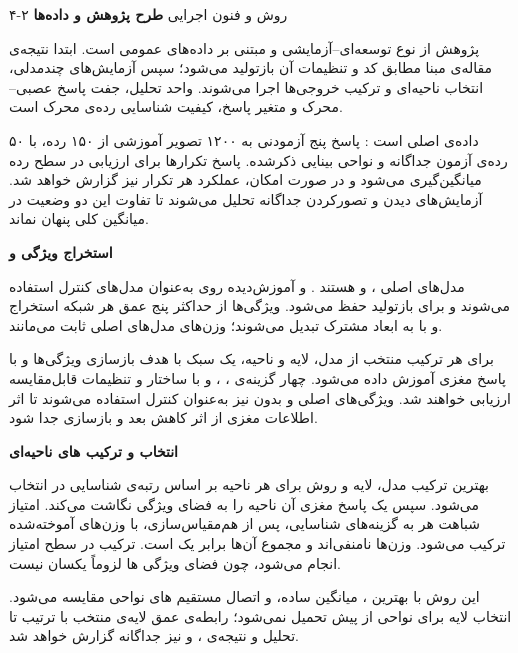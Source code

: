\documentclass{ut-proposal}
\newcommand{\ProposalSubheading}[1]{\textcolor{UTBlue}{\textbf{#1}}}
\begin{document}
	\begin{UTProposalSection}{۴-۲ روش و فنون اجرایی}
		\ProposalSubheading{طرح پژوهش و داده‌ها}

		پژوهش از نوع توسعه‌ای–آزمایشی و مبتنی بر داده‌های عمومی است. ابتدا نتیجه‌ی مقاله‌ی مبنا مطابق کد و تنظیمات آن بازتولید می‌شود؛ سپس آزمایش‌های چندمدلی، انتخاب ناحیه‌ای و ترکیب خروجی‌ها اجرا می‌شوند. واحد تحلیل، جفت پاسخ عصبی–محرک و متغیر پاسخ، کیفیت شناسایی رده‌ی محرک است.

		داده‌ی اصلی  است \lr{[4]}: پاسخ  پنج آزمودنی به ۱۲۰۰ تصویر آموزشی از ۱۵۰ رده، با ۵۰ رده‌ی آزمون جداگانه و نواحی بینایی ذکرشده. پاسخ تکرارها برای ارزیابی در سطح رده میانگین‌گیری می‌شود و در صورت امکان، عملکرد هر تکرار نیز گزارش خواهد شد. آزمایش‌های دیدن و تصورکردن جداگانه تحلیل می‌شوند تا تفاوت این دو وضعیت در میانگین کلی پنهان نماند.

		\ProposalSubheading{استخراج ویژگی و }

		مدل‌های اصلی ،  و  هستند \lr{[5--7]}.  و  آموزش‌دیده روی  به‌عنوان مدل‌های کنترل استفاده می‌شوند و  برای بازتولید  حفظ می‌شود. ویژگی‌ها از حداکثر پنج عمق هر شبکه استخراج و با  به ابعاد مشترک تبدیل می‌شوند؛ وزن‌های مدل‌های اصلی ثابت می‌مانند.

		برای هر ترکیب منتخب از مدل، لایه و ناحیه، یک  سبک با هدف بازسازی ویژگی‌ها و  با پاسخ مغزی آموزش داده می‌شود. چهار گزینه‌ی ، ،  و  با ساختار و تنظیمات قابل‌مقایسه ارزیابی خواهند شد. ویژگی‌های اصلی و  بدون  نیز به‌عنوان کنترل استفاده می‌شوند تا اثر اطلاعات مغزی از اثر کاهش بعد و بازسازی جدا شود.

		\ProposalSubheading{انتخاب و ترکیب های ناحیه‌ای}

		بهترین ترکیب مدل، لایه و روش برای هر ناحیه بر اساس رتبه‌ی شناسایی در  انتخاب می‌شود. سپس یک  پاسخ مغزی آن ناحیه را به فضای ویژگی  نگاشت می‌کند. امتیاز شباهت هر  به گزینه‌های شناسایی، پس از هم‌مقیاس‌سازی، با وزن‌های آموخته‌شده ترکیب می‌شود. وزن‌ها نامنفی‌اند و مجموع آن‌ها برابر یک است. ترکیب در سطح امتیاز انجام می‌شود، چون فضای ویژگی ها لزوماً یکسان نیست.

		این روش با بهترین ، میانگین ساده،  و اتصال مستقیم های نواحی مقایسه می‌شود. انتخاب لایه برای نواحی از پیش تحمیل نمی‌شود؛ رابطه‌ی عمق لایه‌ی منتخب با ترتیب  تا  تحلیل و نتیجه‌ی ،  و  نیز جداگانه گزارش خواهد شد.


\end{UTProposalSection}
\end{document}
